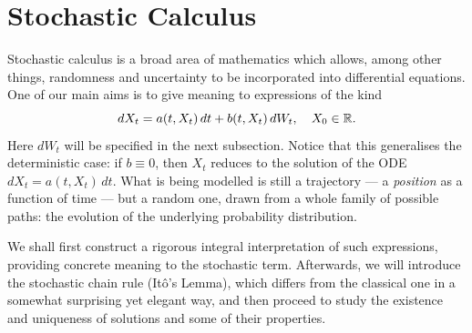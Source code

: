 

    
    
    

\section{Stochastic Calculus}\label{sec:stochasticcalculus}

\vspace{-0.3cm}

Stochastic calculus is a broad area of mathematics which allows, among other things, randomness and uncertainty to be incorporated into differential equations. One of our main aims is to give meaning to expressions of the kind 
\begin{equation}\label{eq:sde_intro}
dX_t = a(t,X_t)\,dt + b(t,X_t)\,dW_t, 
\quad X_0 \in \mathbb{R}.
\end{equation}
Here $dW_t$ will be specified in the next subsection. Notice that this generalises the deterministic case: if $b \equiv 0$, then $X_t$ reduces to the solution of the ODE $dX_t = a(t,X_t)\,dt$. What is being modelled is still a trajectory --- a \textit{position} as a function of time --- but a random one, drawn from a whole family of possible paths: the evolution of the underlying probability distribution.

We shall first construct a rigorous integral interpretation of such expressions, providing concrete meaning to the stochastic term. Afterwards, we will introduce the stochastic chain rule (Itô's Lemma), which differs from the classical one in a somewhat surprising yet elegant way, and then proceed to study the existence and uniqueness of solutions and some of their properties.

